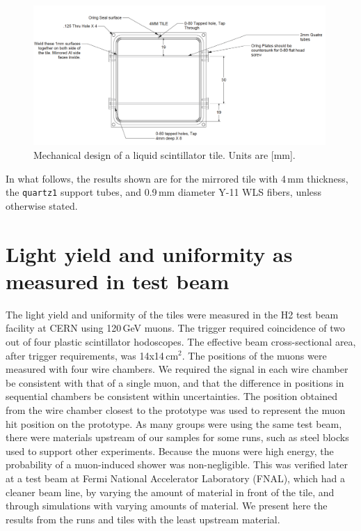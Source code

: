 \documentclass[review]{elsarticle}
\begin{document}
\begin{figure}[!ht]
\begin{center}
\includegraphics[width=0.99\textwidth]{./figures/mechanicaldesign.png}
\caption{Mechanical design of a liquid scintillator tile. Units are
  [mm].}
\label{fig:tiledesign}
\end{center}
\end{figure}

In what follows, the results shown are for the mirrored tile with 4\,mm
thickness, the \verb+quartz1+ support tubes, and 0.9\,mm diameter Y-11 WLS fibers,
unless otherwise stated.

\section{Light yield and uniformity as measured in test beam}

The light yield and uniformity of the tiles were measured in the H2
test beam facility at CERN using 120\,GeV muons. The trigger required
coincidence of two out of four plastic scintillator hodoscopes. The
effective beam cross-sectional area, after trigger requirements, was
14x14\,cm$^2$. The positions of the muons were measured with four
wire chambers. We required the signal in each wire chamber
be consistent with that of a single muon, and that the difference in
positions in sequential chambers be consistent within uncertainties.
The position obtained from the wire chamber closest to the
prototype was used to represent the muon hit position on the prototype. 
As many groups were using the same test beam, there were materials
upstream of our samples for some runs, such as steel blocks
used to support other experiments. Because the
muons were high energy, the probability of a muon-induced shower was
non-negligible. This was verified later at a test beam at Fermi National
Accelerator Laboratory
(FNAL), which
had a cleaner beam line, by varying the amount of material in front of the tile,
and through simulations with varying amounts of material. 
We present here the
results from the runs and tiles with the least upstream material.
\end{document}
